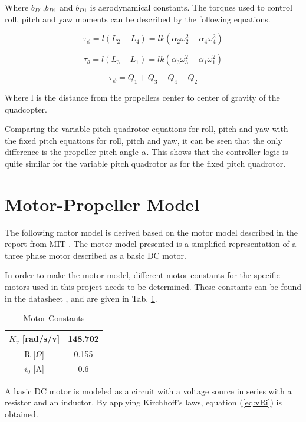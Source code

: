 Where $b_{D1}$,$b_{D1}$ and $b_{D1}$ is aerodynamical constants. The torques used to control roll, pitch and yaw moments can be described by the following equations.

\begin{equation}
   \tau_\phi = l(L_2-L_4) =lk(\alpha_2\omega_2^2-\alpha_4\omega_4^2)
\end{equation}

\begin{equation}
   \tau_\theta = l(L_3-L_1) = lk(\alpha_3\omega_3^2-\alpha_1\omega_1^2)
\end{equation}

\begin{equation}
   \tau_\psi = Q_1 + Q_3 - Q_4 - Q_2
\end{equation}

Where l is the distance from the propellers center to center of gravity of the quadcopter.\bigskip 

Comparing the variable pitch quadrotor equations for roll, pitch and yaw with the fixed pitch equations for roll, pitch and yaw, it can be seen that the only difference is the propeller pitch angle $\alpha$. This shows that the controller logic is quite similar for the variable pitch quadrotor as for the fixed pitch quadrotor.
\newpage

\section{Motor-Propeller Model}
The following motor model is derived based on the motor model described in the report from MIT \cite{MITvpp}. The motor model presented is a simplified representation of a three phase motor described as a basic DC motor.\bigskip %

In order to make the motor model, different motor constants for the specific motors used in this project needs to be determined. These constants can be found in the datasheet \cite{AXI}, and are given in Tab. \ref{tab:motconst}.

\begin{table}[H]
\centering
\caption{Motor Constants}
\label{tab:motconst}
\begin{tabular}{ |c|c| } 
 \hline
 $K_v$ [rad/s/v] & 148.702 \\ 
 \hline
 R [$\Omega$] & 0.155 \\ 
 \hline
 $i_0$ [A] & 0.6 \\ 
 \hline
\end{tabular}
\end{table}
\noindent
A basic DC motor is modeled as a circuit with a voltage source in series with a resistor and an inductor. By applying Kirchhoff's laws, equation (\ref{eq:vRi}) is obtained. 

